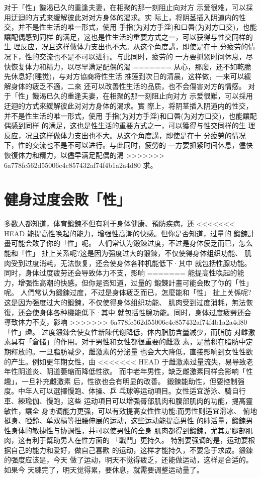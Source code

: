 \documentclass[12pt,UTF8]{ctexbook}
\begin{document}
对于「性」饑渴已久的重逢夫妻，在相聚的那一刻阻止向对方
示爱很难，可以採用迂迴的方式来缓解彼此对对方身体的渴求。实
际上，将阴茎插入阴道内的性交，并不是性生活的唯一形式，使用
手指(为对方手淫)和口唇(为对方口交)，也能讓配偶感到同样
的满足，这也是性生活的重要方式之一，可以获得与性交同样的生
理反应，况且这样做体力支出也不大。从这个角度講，即使是在十
分疲劳的情况下，性的交流也不是不可以进行。与此同时，疲劳的
一方要抓紧时间休息，尽快恢复体力和精力，以尽早满足配偶的渴
=======
从心，那麼，还不如乾脆先休息好(睡觉)，与对方協商将性生活
推莲到次日的清晨，这样做，一來可以緩解身体的疲乏不適，二來
还可以改善性生活的品质，也不会傷害对方的情感。
对于「性」饑渴已久的重逢夫妻，在相聚的那一刻阻止向对方
示爱很難，可以採用迂迴的方式來緩解彼此对对方身体的渴求。實
際上，将阴茎插入阴道内的性交，并不是性生活的唯一形式，使用
手指(为对方手淫)和口唇(为对方口交)，也能讓配偶感到同样
的满足，这也是性生活的重要方式之一，可以獲得与性交同样的生
理反应，况且这样做体力支出也不大。从这个角度講，即使是在十
分疲勞的情况下，性的交流也不是不可以进行。与此同时，疲勞的
一方要抓紧时间休息，儘快恢復体力和精力，以儘早满足配偶的渴
>>>>>>> 6a778fc562d55006c4c857432af74f4b1a2a4d80
求。

\section{健身过度会敗「性」}

多数人都知道，体育鍛鍊不但有利于身体健康、預防疾病，还
<<<<<<< HEAD
能提高性唤起的能力，增强性高潮的快感。但你是否知道，过量的
鍛鍊計畫可能会敗了你的「性」呢。
人们常认为鍛鍊过度，不过是身体疲乏而已，怎么能和「性」
扯上关系呢?这是因为强度过大的鍛鍊，不仅使得身体组织功能、
肌肉受到过度消耗，无法恢复，还会使身体各种机能低下·其中
就包括性腺功能。同时，身体过度疲劳还会导致体力不支，影响
=======
能提高性喚起的能力，增强性高潮的快感。但你是否知道，过量的
鍛鍊計畫可能会敗了你的「性」呢。
人們常认为鍛鍊过度，不过是身体疲乏而已，怎麼能和「性」
扯上关係呢?这是因为强度过大的鍛鍊，不仅使得身体组织功能、
肌肉受到过度消耗，無法恢復，还会使身体各种機能低下·其中
就包括性腺功能。同时，身体过度疲勞还会導致体力不支，影响
>>>>>>> 6a778fc562d55006c4c857432af74f4b1a2a4d80
「性」趣。
过度鍛鍊会使女性新陳代谢降低，体内脂肪含量减少，而脂肪
对雌激素具有「倉储」的作用。对于男性和女性都很重要的雌激
素，是蓄积在脂肪中定期釋放的。一旦脂肪减少，雌激素的分泌量
也会大大降低，直接影响到女性性欲的产生。例如更年期女性，由
<<<<<<< HEAD
于雌激素过量流失，易导致老年性阴道炎、阴道萎缩而降低性欲。
而中老年男性，缺乏雌激素同样会影响「性趣」，一旦补充雌激素
后，性欲也会有明显的改善。
鍛鍊能助性，但要控制强度。中年人可以選擇慢跑、体操、乒
乓球等运动項目。女性适宜游泳、騎自行車、練瑜伽、慢跑，这些
运动項目可以增强臀部肌肉和腹部肌肉的功能，提高靈敏性，讓全
身协调能力更强，可以有效提高女性性功能:而男性则适宜滑冰、
俯地挺身、啞鈴、单双槓等扭腰伸展的运动，这些运动能提高男性
的肺活量，鍛鍊男性身体的敏捷性与协调性，并可以使男性的全身
肌肉都得到鍛鍊，尤其是腿部肌肉，这有利于幫助男人在性方面的
「戰鬥」更持久。
特別要强调的是，运动要根据自己的能力和爱好，做自己喜歡
的运动，这样才能持久，不要急于求成。鍛鍊的强度应该是，今天
做了运动，明天不觉得疲乏，还能做运动，这样是合适的。如果今
天練完了，明天觉得累，要休息，就需要调整运动量了。
\end{document}
